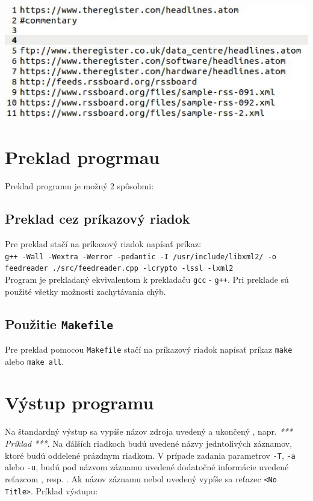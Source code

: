 \documentclass[a4paper, 11pt]{article}
\begin{document}
    \includegraphics[width=0.8\linewidth]{img/feedfile.JPG}

    \section{Preklad progrmau}
    \label{compile}
    Preklad programu je možný 2 spôsobmi:
    
    \subsection{Preklad cez príkazový riadok}
    \label{terminal}
    Pre preklad stačí na príkazový riadok napísať príkaz: \\
    
    \texttt{g++ -Wall -Wextra -Werror -pedantic -I /usr/include/libxml2/ -o feedreader ./src/feedreader.cpp -lcrypto -lssl -lxml2} \\
    
    Program je prekladaný ekvivalentom k prekladaču \texttt{gcc} - \texttt{g++}. Pri preklade sú použité všetky možnosti zachytávania chýb.
    
    \subsection{Použitie \texttt{Makefile}}
    \label{makefile}
    Pre preklad pomocou \texttt{Makefile} stačí na príkazový riadok napísať príkaz \texttt{make} alebo \texttt{make all}.

    \section{Výstup programu}
    \label{output}
    Na štandardný výstup sa vypíše názov zdroja uvedený \uv{***} a ukončený \uv{***}, napr. \textit{*** Príklad ***}. Na ďálších riadkoch budú uvedené názvy jedntolivých záznamov, ktoré budú oddelené prázdnym riadkom.
    V prípade zadania parametrov \texttt{-T}, \texttt{-a} alebo \texttt{-u}, budú pod názvom záznamu uvedené dodatočné informácie uvedené reťazcom ,  resp. . Ak názov záznamu nebol uvedený vypíše sa reťazec \texttt{<No Title>}. Príklad výstupu: \\
\end{document}

